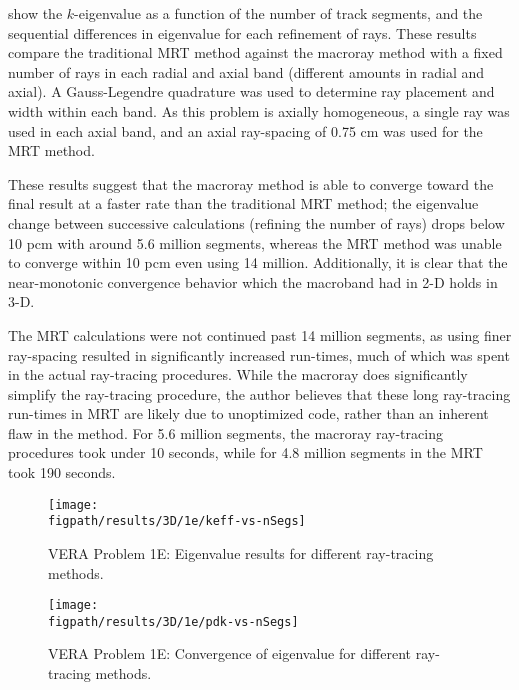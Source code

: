 {{{{         show the $k$-eigenvalue as a function of the number of track segments, and the sequential differences in eigenvalue for each refinement of rays.
        These results compare the traditional \ac{MRT} method against the macroray method with a fixed number of rays in each radial and axial band (different amounts in radial and axial).
        A Gauss-Legendre quadrature was used to determine ray placement and width within each band.
        As this problem is axially homogeneous, a single ray was used in each axial band, and an axial ray-spacing of 0.75 cm was used for the \ac{MRT} method.

        These results suggest that the macroray method is able to converge toward the final result at a faster rate than the traditional \ac{MRT} method;
          the eigenvalue change between successive calculations (refining the number of rays) drops below 10 pcm with around 5.6 million segments, whereas the \ac{MRT} method was unable to converge within 10 pcm even using 14 million.
        Additionally, it is clear that the near-monotonic convergence behavior which the macroband had in 2-D holds in 3-D.

        The \ac{MRT} calculations were not continued past 14 million segments, as using finer ray-spacing resulted in significantly increased run-times, much of which was spent in the actual ray-tracing procedures.
        While the macroray does significantly simplify the ray-tracing procedure, the author believes that these long ray-tracing run-times in \ac{MRT} are likely due to unoptimized code, rather than an inherent flaw in the method.
        For 5.6 million segments, the macroray ray-tracing procedures took under 10 seconds, while for 4.8 million segments in the \ac{MRT} took 190 seconds.

        \begin{figure}[htbp]
          \centering
          \texttt{[image: \\figpath/results/3D/1e/keff-vs-nSegs]}
          \caption{VERA Problem 1E: Eigenvalue results for different ray-tracing methods. \label{fig:MR:1e:3D:keff-vs-nSegs}}
        \end{figure}
        \begin{figure}[htbp]
          \centering
          \texttt{[image: \\figpath/results/3D/1e/pdk-vs-nSegs]}
          \caption{VERA Problem 1E: Convergence of eigenvalue for different ray-tracing methods. \label{fig:MR:1e:3D:pdf-vs-nSegs}}
        \end{figure}
      }
    }

}}
